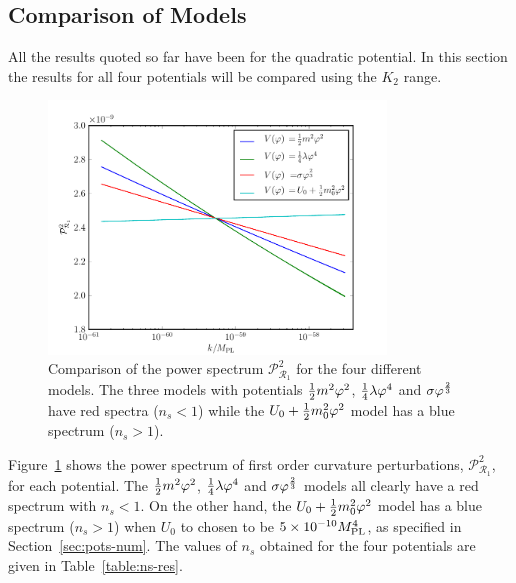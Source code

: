 \subsection{Comparison of Models}
\label{sec:compare-res}
All the results quoted so far have been for the quadratic potential. In this
section
the results for all four potentials will be compared using the $K_2$ range. 
% 
% 
\begin{figure}[htbp]
 \centering
\includegraphics[width=0.8\textwidth]{numerical/graphs/cmp_Pr_allks-large}
\caption[Comparison of $\mathcal{P}^2_{\mathcal{R}_1}$ for the Four
Potentials]{Comparison of the power spectrum $\mathcal{P}^2_{\mathcal{R}_1}$ for
the four different models. The three models with potentials $\frac{1}{2} m^2 \varphi^2$,
$\frac{1}{4}\lambda\varphi^4$ and
$\sigma\varphi^{\frac{2}{3}}$ have red spectra ($n_s <1$) while the $U_0 + \frac{1}{2} m_0^2 \varphi^2$
model has a blue spectrum ($n_s>1$).}
\label{fig:cmp-Pr}
\end{figure}
% 
Figure~\ref{fig:cmp-Pr} shows the power spectrum of first order curvature
perturbations, $\mathcal{P}^2_{\mathcal{R}_1}$, for each
potential. The $\frac{1}{2} m^2 \varphi^2$, $\frac{1}{4}\lambda\varphi^4$ and $\sigma\varphi^{\frac{2}{3}}$ models all
clearly have
a red spectrum with $n_s <1$. On the other hand, the $U_0 + \frac{1}{2} m_0^2 \varphi^2$ model has
a blue
spectrum ($n_s>1$) when $U_0$ to chosen to be $5\times 10^{-10}M_{\mathrm{PL}}^4$, as specified in
Section~\ref{sec:pots-num}. 
% 
The values of $n_s$ obtained for the four potentials are given in Table~\ref{table:ns-res}. 
% 

